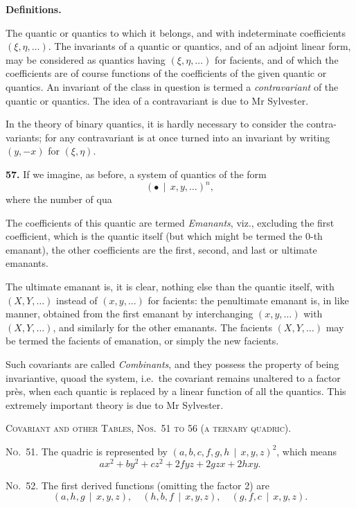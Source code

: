 \documentclass[11pt,a4paper]{book}
\begin{document}
\begin{center}
\clearpage
\noindent\textbf{Definitions.}

The quantic or quantics to which it belongs, and with indeterminate coefficients
$(\xi, \eta, \ldots)$. The invariants of a quantic or quantics, and of an adjoint linear form, may
be considered as quantics having $(\xi, \eta, \ldots)$ for facients, and of which the coefficients
are of course functions of the coefficients of the given quantic or quantics.
An invariant of the class in question is termed a \textit{contravariant} of the quantic
or quantics. The idea of a contravariant is due to Mr Sylvester.

In the theory of binary quantics, it is hardly necessary to consider the contra-
variants; for any contravariant is at once turned into an invariant by writing
$(y, -x)$ for $(\xi, \eta)$.

\textbf{57.} If we imagine, as before, a system of quantics of the form
\[(\bullet\, \mid\, x, y, \ldots)^n,\]
where the number of qua

\bigskip
The coefficients of this quantic are termed \textit{Emanants}, viz., excluding the first
coefficient, which is the quantic itself (but which might be termed the 0-th emanant),
the other coefficients are the first, second, and last or ultimate emanants.

The ultimate emanant is, it is clear, nothing else than the quantic itself,
with $(X, Y, \ldots)$ instead of $(x, y, \ldots)$ for facients: the penultimate emanant is, in like
manner, obtained from the first emanant by interchanging $(x, y, \ldots)$ with $(X, Y, \ldots)$,
and similarly for the other emanants. The facients $(X, Y, \ldots)$ may be termed
the facients of emanation, or simply the new facients.

Such covariants are called \textit{Combinants}, and they possess the property of being
invariantive, quoad the system, i.e.\ the covariant remains unaltered to a factor pr\`es,
when each quantic is replaced by a linear function of all the quantics.
This extremely important theory is due to Mr Sylvester.

\clearpage
\noindent\textsc{Covariant and other Tables, Nos.~51 to 56 (a ternary quadric).}

\noindent\textsc{No.~51.} The quadric is represented by $(a, b, c, f, g, h \, \mid\, x, y, z)^2$,
which means
\[ax^2 + by^2 + cz^2 + 2fyz + 2gzx + 2hxy.\]

\noindent\textsc{No.~52.} The first derived functions (omitting the factor 2) are
\[(a, h, g \, \mid\, x, y, z),\quad (h, b, f \, \mid\, x, y, z),\quad (g, f, c \, \mid\, x, y, z).\]


\end{center}
\end{document}
